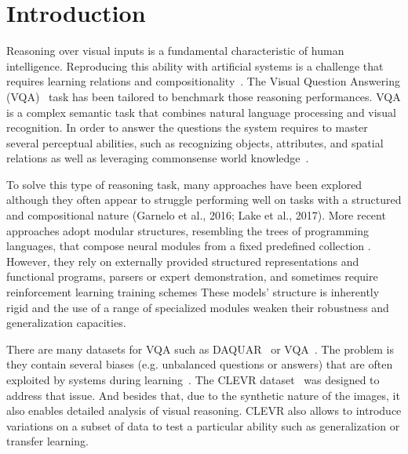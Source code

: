 \section{Introduction}
Reasoning over visual inputs is a fundamental characteristic of human intelligence.
Reproducing this ability with artificial systems is a challenge that requires learning relations and compositionality~\citep{hu2017learning, johnson2017inferring}. The Visual Question Answering (VQA)~\citep{antol2015vqa,malinowski2014towards,wu2017visual} task has been tailored to benchmark those reasoning performances. VQA is a complex semantic task that combines natural language processing and visual recognition.
In order to answer the questions the system  requires to master several perceptual abilities, such as recognizing objects, attributes, and spatial relations as well as leveraging commonsense world knowledge~\citep{hudson2018compositional}.

To solve this type of reasoning task, many approaches have been explored although they often appear to struggle performing well on tasks with a structured and compositional nature (Garnelo et al., 2016; Lake et al., 2017). 
More recent approaches adopt modular structures, resembling the trees of programming languages, that compose neural modules from a fixed predefined collection \cite{andreas2016learning,johnson2017inferring, mascharka2018transparency}. However, they rely on externally provided structured representations and functional programs, parsers or expert demonstration, and sometimes require reinforcement learning training schemes
These models’ structure is inherently rigid and the use of a range of specialized modules weaken their robustness and generalization capacities.

There are many datasets for VQA such as DAQUAR~\citep{malinowski2014multi} or VQA~\citep{antol2015vqa}. The problem is they contain several biases (e.g. unbalanced questions or answers) that are often exploited by systems during learning~\citep{goyal2017making}.
The CLEVR dataset~\citep{johnson2017clevr} was designed to address that issue.
And besides that, due to the synthetic nature of the images, it also enables detailed analysis of visual reasoning.
CLEVR also allows to introduce variations on a subset of data to test a particular ability such as generalization or transfer learning.


